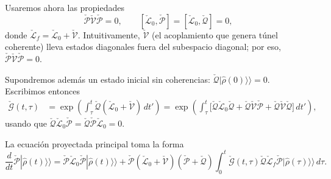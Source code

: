 \begin{appendixs}
Usaremos ahora las propiedades
\begin{equation*}
    \check{\mathcal{P}}\check{\mathcal{V}}\check{\mathcal{P}}=0,
    \qquad
    [\check{\mathcal{L}}_{0},\check{\mathcal{P}}]=[\check{\mathcal{L}}_{0},\check{\mathcal{Q}}]=0,
\end{equation*}
donde $\check{\mathcal{L}}_{f}=\check{\mathcal{L}}_{0}+\check{\mathcal{V}}$. Intuitivamente,
$\check{\mathcal{V}}$ (el acoplamiento que genera túnel coherente) lleva estados diagonales fuera
del subespacio diagonal; por eso, $\check{\mathcal{P}}\check{\mathcal{V}}\check{\mathcal{P}}=0$.

Supondremos además un estado inicial sin coherencias:
$\check{\mathcal{Q}}|\hat{\rho}(0)\rangle\rangle=0$.
Escribimos entonces
\begin{align*}
    \check{\mathcal{G}}(t,\tau)
    &=\exp\!\left(\int_{\tau}^{t}\check{\mathcal{Q}}(\check{\mathcal{L}}_{0}+\check{\mathcal{V}})\,dt'\right)
      =\exp\!\left(\int_{\tau}^{t}\big[\check{\mathcal{Q}}\check{\mathcal{L}}_{0}\check{\mathcal{Q}}
      +\check{\mathcal{Q}}\check{\mathcal{V}}\check{\mathcal{P}}
      +\check{\mathcal{Q}}\check{\mathcal{V}}\check{\mathcal{Q}}\big]\,dt'\right),
\end{align*}
usando que $\check{\mathcal{Q}}\check{\mathcal{L}}_{0}\check{\mathcal{P}}=\check{\mathcal{Q}}\check{\mathcal{P}}\check{\mathcal{L}}_{0}=0$.

La ecuación proyectada principal toma la forma
\begin{equation*}
    \frac{d}{dt}\check{\mathcal{P}}|\hat{\rho}(t)\rangle\rangle
    =\check{\mathcal{P}}\check{\mathcal{L}}_{0}\check{\mathcal{P}}|\hat{\rho}(t)\rangle\rangle
     +\check{\mathcal{P}}(\check{\mathcal{L}}_{0}+\check{\mathcal{V}})(\check{\mathcal{P}}+\check{\mathcal{Q}})
      \int_{0}^{t}\!\check{\mathcal{G}}(t,\tau)\check{\mathcal{Q}}\check{\mathcal{L}}_{f}\check{\mathcal{P}}
      |\hat{\rho}(\tau)\rangle\rangle\,d\tau .
\end{equation*}


\end{appendixs}

